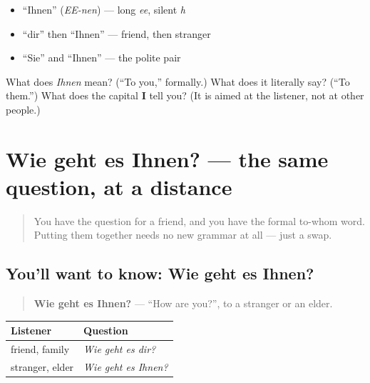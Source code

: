 \begin{itemize}
\raggedright
  \item \textquotedblleft{}Ihnen\textquotedblright{} (\emph{EE-nen}) — long \emph{ee}, silent \emph{h}
  \item \textquotedblleft{}dir\textquotedblright{} then \textquotedblleft{}Ihnen\textquotedblright{} — friend, then stranger
  \item \textquotedblleft{}Sie\textquotedblright{} and \textquotedblleft{}Ihnen\textquotedblright{} — the polite pair
\end{itemize}

\begin{tcolorbox}[breakable,colback=teal!4,colframe=teal!35!black,title={Before you move on}]
What does \emph{Ihnen} mean? (\textquotedblleft{}To you,\textquotedblright{} formally.) What does it literally say? (\textquotedblleft{}To them.\textquotedblright{}) What does the capital \textbf{I} tell you? (It is aimed at the listener, not at other people.)
\end{tcolorbox}
\section[Wie geht es Ihnen?]{Wie geht es Ihnen? — the same question, at a distance}

\label{lesson:GE-C03-wie-geht-register}



\begin{quote}
You have the question for a friend, and you have the formal to-whom word. Putting them together needs no new grammar at all — just a swap.
\end{quote}

\subsection*{You'll want to know: Wie geht es Ihnen?}
\begin{quote}
\textbf{Wie geht es Ihnen?} — \textquotedblleft{}How are you?\textquotedblright{}, to a stranger or an elder.
\end{quote}

\noindent
\begin{tabularx}{\linewidth}{@{}>{\raggedright\arraybackslash}X>{\raggedright\arraybackslash}X@{}}
\toprule
\textbf{Listener} & \textbf{Question} \\
\midrule
friend, family & \emph{Wie geht es dir?} \\
stranger, elder & \emph{Wie geht es Ihnen?} \\
\bottomrule
\end{tabularx}

